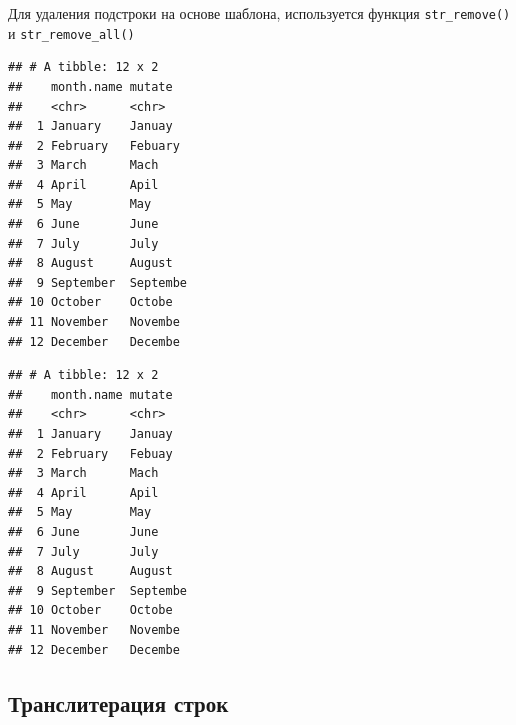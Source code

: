 \documentclass[
]{book}
\newenvironment{Shaded}{\begin{snugshade}}{\end{snugshade}}
\newcommand{\DataTypeTok}[1]{\textcolor[rgb]{0.13,0.29,0.53}{#1}}
\newcommand{\KeywordTok}[1]{\textcolor[rgb]{0.13,0.29,0.53}{\textbf{#1}}}
\newcommand{\NormalTok}[1]{#1}
\newcommand{\OperatorTok}[1]{\textcolor[rgb]{0.81,0.36,0.00}{\textbf{#1}}}
\newcommand{\StringTok}[1]{\textcolor[rgb]{0.31,0.60,0.02}{#1}}
\begin{document}
Для удаления подстроки на основе шаблона, используется функция \texttt{str\_remove()} и \texttt{str\_remove\_all()}

\begin{Shaded}
\end{Shaded}

\begin{verbatim}
## # A tibble: 12 x 2
##    month.name mutate  
##    <chr>      <chr>   
##  1 January    Januay  
##  2 February   Febuary 
##  3 March      Mach    
##  4 April      Apil    
##  5 May        May     
##  6 June       June    
##  7 July       July    
##  8 August     August  
##  9 September  Septembe
## 10 October    Octobe  
## 11 November   Novembe 
## 12 December   Decembe
\end{verbatim}

\begin{Shaded}
\end{Shaded}

\begin{verbatim}
## # A tibble: 12 x 2
##    month.name mutate  
##    <chr>      <chr>   
##  1 January    Januay  
##  2 February   Febuay  
##  3 March      Mach    
##  4 April      Apil    
##  5 May        May     
##  6 June       June    
##  7 July       July    
##  8 August     August  
##  9 September  Septembe
## 10 October    Octobe  
## 11 November   Novembe 
## 12 December   Decembe
\end{verbatim}

\hypertarget{ux442ux440ux430ux43dux441ux43bux438ux442ux435ux440ux430ux446ux438ux44f-ux441ux442ux440ux43eux43a}{%
\subsection{Транслитерация строк}\label{ux442ux440ux430ux43dux441ux43bux438ux442ux435ux440ux430ux446ux438ux44f-ux441ux442ux440ux43eux43a}}
\end{document}
